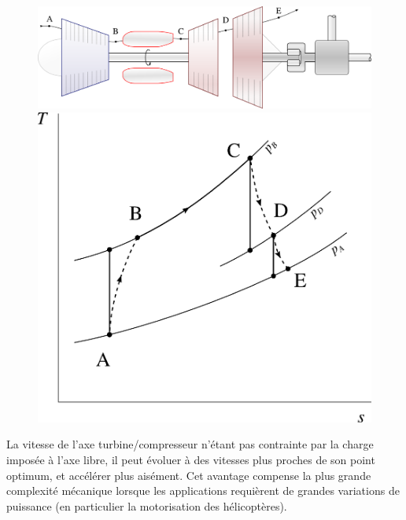 {{		\begin{figure}
			\begin{center}
				\includegraphics[scale=0.6]{images/circuit_turbine_libre.png}\vspace{0.5cm}
				\includegraphics[scale=0.8]{images/ts_gp_turbine_libre.png}
			\end{center}
			\label{fig_turbine_libre}
		\end{figure}

		La vitesse de l’axe turbine/compresseur n’étant pas contrainte par la charge imposée à l’axe libre, il peut évoluer à des vitesses plus proches de son point optimum, et accélérer plus aisément. Cet avantage compense la plus grande complexité mécanique lorsque les applications requièrent de grandes variations de puissance (en particulier la motorisation des hélicoptères).

}}
